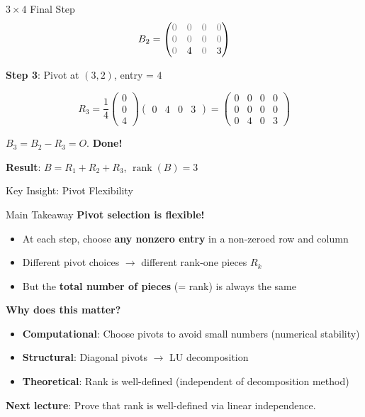 \documentclass[10pt]{beamer}
\theoremstyle{definition}
\newcommand{\rem}[1]{{\color{gray}#1}}                %
\newcommand{\x}[1]{\alert{\textbf{#1}}}
\begin{document}
\begin{frame}{$3 \times 4$ Final Step}
$$B_2 = \begin{pmatrix}
\rem{0} & \rem{0} & \rem{0} & \rem{0} \\
\rem{0} & \rem{0} & \rem{0} & \rem{0} \\
\rem{0} & 4 & \rem{0} & 3
\end{pmatrix}$$

\vfill
\textbf{Step 3}: Pivot at $(3,2)$, entry = $4$

$$R_3 = \frac{1}{4} \begin{pmatrix} 0 \\ 0 \\ 4 \end{pmatrix}
\begin{pmatrix} 0 & 4 & 0 & 3 \end{pmatrix}
= \begin{pmatrix}
0 & 0 & 0 & 0 \\
0 & 0 & 0 & 0 \\
0 & 4 & 0 & 3
\end{pmatrix}$$

\vfill
$B_3 = B_2 - R_3 = O$. \quad \x{Done!}

\vfill
\textbf{Result}: $B = R_1 + R_2 + R_3$, \quad $\operatorname{rank}(B) = 3$
\end{frame}

\begin{frame}{Key Insight: Pivot Flexibility}
\begin{alertblock}{Main Takeaway}
\textbf{Pivot selection is flexible!}
\begin{itemize}
\item At each step, choose \x{any nonzero entry} in a non-zeroed row and column
\item Different pivot choices $\to$ different rank-one pieces $R_k$
\item But the \x{total number of pieces} (= rank) is always the same
\end{itemize}
\end{alertblock}

\vfill
\textbf{Why does this matter?}
\begin{itemize}
\item \textbf{Computational}: Choose pivots to avoid small numbers (numerical stability)
\item \textbf{Structural}: Diagonal pivots $\to$ LU decomposition
\item \textbf{Theoretical}: Rank is well-defined (independent of decomposition method)
\end{itemize}

\vfill
\textbf{Next lecture}: Prove that rank is well-defined via linear independence.
\end{frame}
\end{document}
